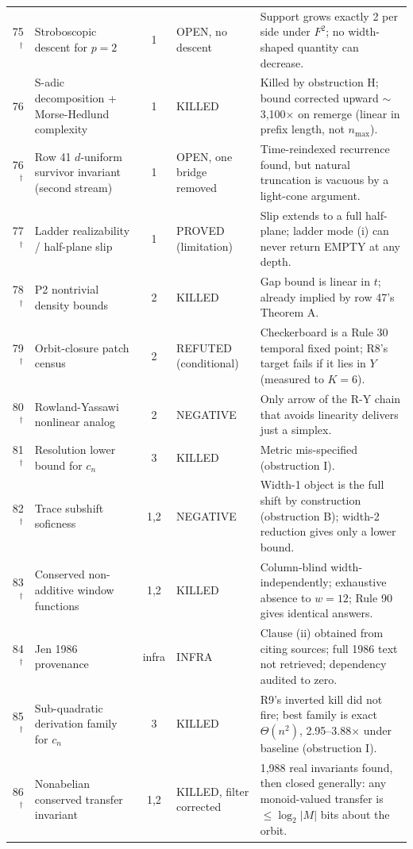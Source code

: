 \documentclass[11pt]{article}
\theoremstyle{definition}
\begin{document}
{\begin{longtable}{@{}r p{4.0cm} c p{1.7cm} p{6.1cm}@{}}
75$^\dagger$ & Stroboscopic descent for $p=2$ & 1 & OPEN, no descent & Support grows exactly 2 per side under $F^2$; no width-shaped quantity can decrease. \\
76 & S-adic decomposition + Morse-Hedlund complexity & 1 & KILLED & Killed by obstruction H; bound corrected upward $\sim$3{,}100$\times$ on remerge (linear in prefix length, not $n_{\max}$). \\
76$^\dagger$ & Row 41 $d$-uniform survivor invariant (second stream) & 1 & OPEN, one bridge removed & Time-reindexed recurrence found, but natural truncation is vacuous by a light-cone argument. \\
77$^\dagger$ & Ladder realizability / half-plane slip & 1 & PROVED (limitation) & Slip extends to a full half-plane; ladder mode (i) can never return EMPTY at any depth. \\
78$^\dagger$ & P2 nontrivial density bounds & 2 & KILLED & Gap bound is linear in $t$; already implied by row 47's Theorem A. \\
79$^\dagger$ & Orbit-closure patch census & 2 & REFUTED (conditional) & Checkerboard is a Rule 30 temporal fixed point; R8's target fails if it lies in $Y$ (measured to $K=6$). \\
80$^\dagger$ & Rowland-Yassawi nonlinear analog & 2 & NEGATIVE & Only arrow of the R-Y chain that avoids linearity delivers just a simplex. \\
81$^\dagger$ & Resolution lower bound for $c_n$ & 3 & KILLED & Metric mis-specified (obstruction I). \\
82$^\dagger$ & Trace subshift soficness & 1,2 & NEGATIVE & Width-1 object is the full shift by construction (obstruction B); width-2 reduction gives only a lower bound. \\
83$^\dagger$ & Conserved non-additive window functions & 1,2 & KILLED & Column-blind width-independently; exhaustive absence to $w=12$; Rule 90 gives identical answers. \\
84$^\dagger$ & Jen 1986 provenance & infra & INFRA & Clause (ii) obtained from citing sources; full 1986 text not retrieved; dependency audited to zero. \\
85$^\dagger$ & Sub-quadratic derivation family for $c_n$ & 3 & KILLED & R9's inverted kill did not fire; best family is exact $\Theta(n^2)$, 2.95--3.88$\times$ under baseline (obstruction I). \\
86$^\dagger$ & Nonabelian conserved transfer invariant & 1,2 & KILLED, filter corrected & 1{,}988 real invariants found, then closed generally: any monoid-valued transfer is $\le\log_2|M|$ bits about the orbit. \\

\end{longtable}}
\end{document}
